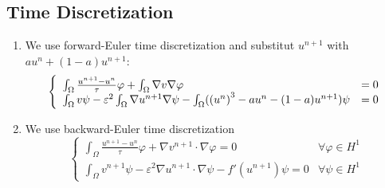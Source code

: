\documentclass[cmbright]{mymmaauth}
\begin{document}
\subsection{Time Discretization}
\begin{enumerate}
\item  We use forward-Euler time discretization and  substitut $u^{n+1}$ with $a u^{n} + (1-a) u^{n+1}$:
\begin{equation} \left\{ \begin{array}{ll}
\int_\Omega \frac{u^{n+1} - u^{n}}{\tau} \varphi + \int_\Omega \nabla v \nabla \varphi & = 0 \\
\int_\Omega v \psi - \varepsilon^2 \int_\Omega \nabla u^{n+1} \nabla \psi - \int_\Omega(\left(u^{n}\right)^3 - a u^{n} - (1-a)u^{n+1}) \psi & = 0
\end{array} \right. \end{equation}
\item We use backward-Euler time discretization
\begin{equation} \left\{ \begin{array}{ll}
\int_\Omega{\frac{u^{n+1}-u^n}{\tau}}\varphi+\nabla v^{n+1}\cdot\nabla\varphi=0&\forall \varphi\in H^1\\
\int_\Omega v^{n+1}\psi-\varepsilon^2\nabla
u^{n+1}\cdot\nabla\psi-f'(u^{n+1})\psi=0&\forall \psi\in H^1
\end{array} \right. \end{equation}
\end{enumerate}
\end{document}
